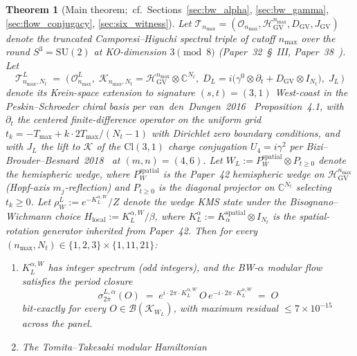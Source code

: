 \documentclass[11pt,a4paper]{article}
\theoremstyle{plain}
\newtheorem{theorem}{Theorem}[section]
\theoremstyle{definition}
\newcommand{\nmax}{n_{\max}}
\newcommand{\Nt}{N_t}
\newcommand{\sthree}{S^{3}}
\newcommand{\Hilb}{\mathcal{H}}
\newcommand{\Krein}{\mathcal{K}}
\newcommand{\Op}{\mathcal{O}}
\newcommand{\Tcal}{\mathcal{T}}
\newcommand{\Bcal}{\mathcal{B}}
\newcommand{\C}{\mathbb{C}}
\newcommand{\SU}{\mathrm{SU}}
\newcommand{\DGV}{D_{\mathrm{GV}}}
\newcommand{\DL}{D_{L}}
\newcommand{\KL}{K_{L}}
\newcommand{\JL}{J_{L}}
\newcommand{\Cl}{\mathrm{Cl}}
\begin{document}
\begin{theorem}[Main theorem;\ cf.~Sections~\ref{sec:bw_alpha},
\ref{sec:bw_gamma}, \ref{sec:flow_conjugacy}, \ref{sec:six_witness}]
\label{thm:main_intro}
Let $\Tcal_{\nmax} = (\Op_{\nmax}, \Hilb_{\mathrm{GV}}^{\nmax},
\DGV, J_{\mathrm{GV}})$ denote the truncated Camporesi--Higuchi
spectral triple of cutoff $\nmax$ over the round $\sthree = \SU(2)$ at
KO-dimension $3 \pmod 8$ (Paper~32~\S~III, Paper~38~\cite{paper38}).
Let
\[
   \Tcal_{\nmax, \Nt}^L
   \;=\; \bigl(\,
     \Op_{\nmax}^L,\;
     \Krein_{\nmax, \Nt} = \Hilb_{\mathrm{GV}}^{\nmax} \otimes \C^{\Nt},\;
     \DL = i \bigl(\gamma^0 \otimes \partial_t
            + \DGV \otimes I_{\Nt}\bigr),\;
     \JL
   \,\bigr)
\]
denote its Krein-space extension to signature $(s, t) = (3, 1)$ West-coast
in the Peskin--Schroeder chiral basis per
van~den~Dungen~2016~\cite{vandungen2016} Proposition~4.1, with
$\partial_t$ the centered finite-difference operator on the uniform
grid $t_k = -T_{\max} + k \cdot 2T_{\max}/(\Nt - 1)$ with Dirichlet
zero boundary conditions, and with $\JL$ the lift to $\Krein$ of the
$\Cl(3, 1)$ charge conjugation $U_4 = i\gamma^2$ per
Bizi--Brouder--Besnard~2018~\cite{bizi_brouder_besnard2018} at
$(m, n) = (4, 6)$. Let $W_L := P_W^{\mathrm{spatial}} \otimes P_{t \ge 0}$
denote the hemispheric wedge, where $P_W^{\mathrm{spatial}}$ is the
Paper~42 hemispheric wedge on $\Hilb_{\mathrm{GV}}^{\nmax}$ (Hopf-axis
$m_j$-reflection) and $P_{t \ge 0}$ is the diagonal projector on
$\C^{\Nt}$ selecting $t_k \ge 0$. Let $\rho_W^L := e^{-\KL^{\alpha,
W}}/Z$ denote the wedge KMS state under the Bisognano--Wichmann choice
$H_{\mathrm{local}} := \KL^{\alpha, W} / \beta$, where
$\KL^\alpha := K_\alpha^{\mathrm{spatial}} \otimes I_{\Nt}$ is the
spatial-rotation generator inherited from Paper~42. Then for every
$(\nmax, \Nt) \in \{1, 2, 3\} \times \{1, 11, 21\}$:
\begin{enumerate}\setlength{\itemsep}{2pt}
\item[(i)] $\KL^{\alpha, W}$ has integer spectrum (odd integers),
and the BW-$\alpha$ modular flow satisfies the period closure
\begin{equation}\label{eq:bw_alpha_lorentz_main}
   \sigma_{2\pi}^{L, \alpha}(O)
   \;=\; e^{i \cdot 2\pi \cdot \KL^{\alpha, W}}\, O\,
         e^{-i \cdot 2\pi \cdot \KL^{\alpha, W}}
   \;=\; O
\end{equation}
bit-exactly for every $O \in \Bcal(\Krein_{W_L})$, with maximum
residual $\le 7 \times 10^{-15}$ across the panel.
\item[(ii)] The Tomita--Takesaki modular Hamiltonian

\end{enumerate}
\end{theorem}
\end{document}
